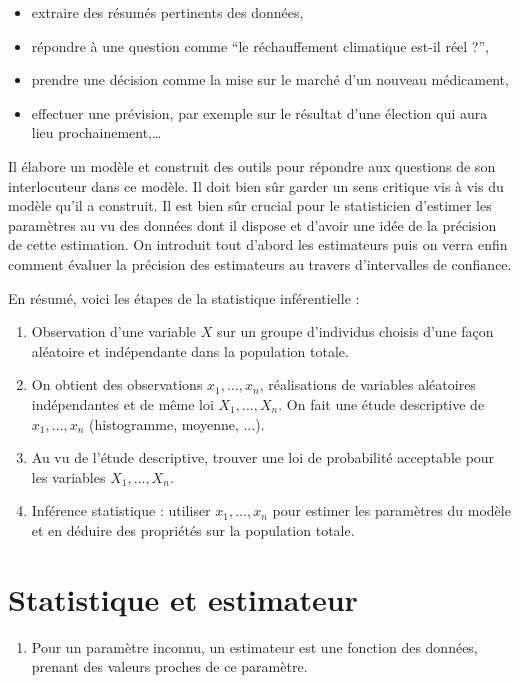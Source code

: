 \documentclass[]{book}
\providecommand{\tightlist}{%
  \setlength{\itemsep}{0pt}\setlength{\parskip}{0pt}}
\theoremstyle{definition}
\theoremstyle{definition}
\theoremstyle{remark}
\begin{document}
\begin{itemize}
\tightlist
\item
  extraire des résumés pertinents des données,
\item
  répondre à une question comme ``le réchauffement climatique est-il
  réel ?'',
\item
  prendre une décision comme la mise sur le marché d'un nouveau
  médicament,
\item
  effectuer une prévision, par exemple sur le résultat d'une élection
  qui aura lieu prochainement,\ldots{}
\end{itemize}

Il élabore un modèle et construit des outils pour répondre aux questions
de son interlocuteur dans ce modèle. Il doit bien sûr garder un sens
critique vis à vis du modèle qu'il a construit. Il est bien sûr crucial
pour le statisticien d'estimer les paramètres au vu des données dont il
dispose et d'avoir une idée de la précision de cette estimation. On
introduit tout d'abord les estimateurs puis on verra enfin comment
évaluer la précision des estimateurs au travers d'intervalles de
confiance.

En résumé, voici les étapes de la statistique inférentielle :

\begin{enumerate}
\def\labelenumi{\arabic{enumi}.}
\item
  Observation d'une variable \(X\) sur un groupe d'individus choisis
  d'une façon aléatoire et indépendante dans la population totale.
\item
  On obtient des observations \(x_1, \ldots,x_n\), réalisations de
  variables aléatoires indépendantes et de même loi \(X_1,\ldots,X_n\).
  On fait une étude descriptive de \(x_1, \ldots,x_n\) (histogramme,
  moyenne, \(\ldots\)).
\item
  Au vu de l'étude descriptive, trouver une loi de probabilité
  acceptable pour les variables \(X_1, \ldots,X_n\).
\item
  Inférence statistique : utiliser \(x_1, \ldots,x_n\) pour estimer les
  paramètres du modèle et en déduire des propriétés sur la population
  totale.
\end{enumerate}

\section{Statistique et estimateur}\label{statistique-et-estimateur}

\begin{enumerate}
\def\labelenumi{\arabic{enumi}.}
\tightlist
\item
  Pour un paramètre inconnu, un estimateur est une fonction des données,
  prenant des valeurs proches de ce paramètre.
\end{enumerate}
\end{document}
